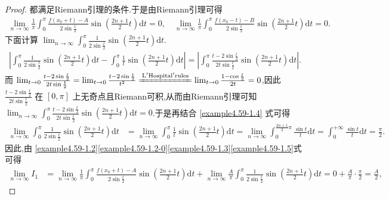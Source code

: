 \documentclass[../../main.tex]{subfiles}%
\begin{document}
\begin{proof}
都满足Riemann引理的条件.于是由Riemann引理可得
\begin{align}\label{example4.59-1.3}
\lim_{n\rightarrow \infty} \frac{1}{\pi}\int_0^{\pi}{\frac{f(x_0 + t) - A}{2\sin \frac{t}{2}}\sin \left( \frac{2n + 1}{2}t \right) \mathrm{d}t}=0, \quad \lim_{n\rightarrow \infty} \frac{1}{\pi}\int_0^{\pi}{\frac{f(x_0 - t) - B}{2\sin \frac{t}{2}}\sin \left( \frac{2n + 1}{2}t \right) \mathrm{d}t}=0.
\end{align}
下面计算 \(\lim_{n\rightarrow \infty} \int_0^{\pi}{\frac{1}{2\sin \frac{t}{2}}\sin \left( \frac{2n + 1}{2}t \right) \mathrm{d}t}\).
\begin{align}\label{example4.59-1.4}
\left| \int_0^{\pi}{\frac{1}{2\sin \frac{t}{2}}\sin \left( \frac{2n + 1}{2}t \right) \mathrm{d}t}-\int_0^{\pi}{\frac{1}{t}\sin \left( \frac{2n + 1}{2}t \right) \mathrm{d}t} \right|=\left| \int_0^{\pi}{\frac{t - 2\sin \frac{t}{2}}{2t\sin \frac{t}{2}}\sin \left( \frac{2n + 1}{2}t \right) \mathrm{d}t} \right|.
\end{align}
而 \(\lim_{t\rightarrow 0} \frac{t - 2\sin \frac{t}{2}}{2t\sin \frac{t}{2}}=\lim_{t\rightarrow 0} \frac{t - 2\sin \frac{t}{2}}{t^2}\xlongequal{\mathrm{L}'\mathrm{Hospital}'\mathrm{rules}}\lim_{t\rightarrow 0} \frac{1 - \cos \frac{t}{2}}{2t}=0\),因此 \(\frac{t - 2\sin \frac{t}{2}}{2t\sin \frac{t}{2}}\) 在 \([0, \pi]\) 上无奇点且Riemann可积,从而由Riemann引理可知 \(\lim_{n\rightarrow \infty} \int_0^{\pi}{\frac{t - 2\sin \frac{t}{2}}{2t\sin \frac{t}{2}}\sin \left( \frac{2n + 1}{2}t \right) \mathrm{d}t}=0\).于是再结合 \eqref{example4.59-1.4} 式可得
\begin{align}\label{example4.59-1.5}
\lim_{n\rightarrow \infty} \int_0^{\pi}{\frac{1}{2\sin \frac{t}{2}}\sin \left( \frac{2n + 1}{2}t \right) \mathrm{d}t}&=\lim_{n\rightarrow \infty} \int_0^{\pi}{\frac{1}{t}\sin \left( \frac{2n + 1}{2}t \right) \mathrm{d}t}
=\lim_{n\rightarrow \infty} \int_0^{\frac{2n + 1}{2}\pi}{\frac{\sin t}{t}\mathrm{d}t}
=\int_0^{+\infty}{\frac{\sin t}{t}\mathrm{d}t}=\frac{\pi}{2}.
\end{align}
因此,由 \eqref{example4.59-1.2}\eqref{example4.59-1.2-0}\eqref{example4.59-1.3}\eqref{example4.59-1.5}式可得
\begin{align*}
\lim_{n\rightarrow \infty} I_1&=\lim_{n\rightarrow \infty} \frac{1}{\pi}\int_0^{\pi}{\frac{f(x_0 + t) - A}{2\sin \frac{t}{2}}\sin \left( \frac{2n + 1}{2}t \right) \mathrm{d}t}+\lim_{n\rightarrow \infty} \frac{A}{\pi}\int_0^{\pi}{\frac{1}{2\sin \frac{t}{2}}\sin \left( \frac{2n + 1}{2}t \right) \mathrm{d}t}
=0 + \frac{A}{\pi}\cdot \frac{\pi}{2}
=\frac{A}{2},
\end{align*}


\end{proof}
\end{document}
